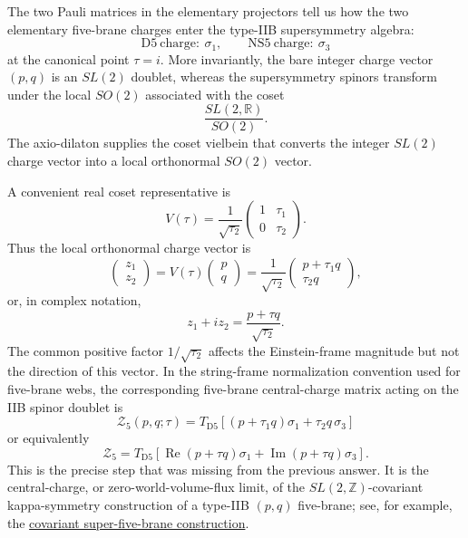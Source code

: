 \documentclass[
  10pt,
  a4paper,
  openany]{book}
\begin{document}
The two Pauli matrices in the elementary projectors tell us how the two
elementary five-brane charges enter the type-IIB supersymmetry algebra:
\[
\mathrm{D5\ charge}:\ \sigma_1,
\qquad
\mathrm{NS5\ charge}:\ \sigma_3
\] at the canonical point \(\tau=i\). More invariantly, the bare integer
charge vector \((p,q)\) is an \(SL(2)\) doublet, whereas the
supersymmetry spinors transform under the local \(SO(2)\) associated
with the coset \[
\frac{SL(2,\mathbb R)}{SO(2)}.
\] The axio-dilaton supplies the coset vielbein that converts the
integer \(SL(2)\) charge vector into a local orthonormal \(SO(2)\)
vector.

A convenient real coset representative is \[
V(\tau)
=\frac1{\sqrt{\tau_2}}
\begin{pmatrix}
1&\tau_1\\
0&\tau_2
\end{pmatrix}.
\] Thus the local orthonormal charge vector is \[
\begin{pmatrix}
z_1\\
z_2
\end{pmatrix}
=V(\tau)
\begin{pmatrix}
p\\
q
\end{pmatrix}
=\frac1{\sqrt{\tau_2}}
\begin{pmatrix}
p+\tau_1q\\
\tau_2q
\end{pmatrix},
\] or, in complex notation, \[
z_1+iz_2=\frac{p+\tau q}{\sqrt{\tau_2}}.
\] The common positive factor \(1/\sqrt{\tau_2}\) affects the
Einstein-frame magnitude but not the direction of this vector. In the
string-frame normalization convention used for five-brane webs, the
corresponding five-brane central-charge matrix acting on the IIB spinor
doublet is \[
\boxed{
\mathcal Z_5(p,q;\tau)
=T_{\mathrm{D5}}
\left[
(p+\tau_1q)\sigma_1+\tau_2q\,\sigma_3
\right]
}
\] or equivalently \[
\boxed{
\mathcal Z_5
=T_{\mathrm{D5}}
\left[
\operatorname{Re}(p+\tau q)\sigma_1
+\operatorname{Im}(p+\tau q)\sigma_3
\right].
}
\] This is the precise step that was missing from the previous answer.
It is the central-charge, or zero-world-volume-flux limit, of the
\(SL(2,\mathbb Z)\)-covariant kappa-symmetry construction of a type-IIB
\((p,q)\) five-brane; see, for example, the
\href{https://arxiv.org/abs/hep-th/9905019}{covariant super-five-brane
construction}.
\end{document}
